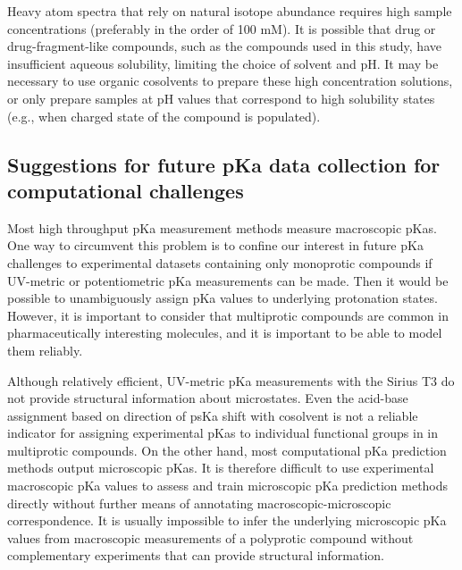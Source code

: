 \documentclass[9pt,lineno]{elife}
\begin{document}
Heavy atom spectra that rely on natural isotope abundance requires high sample concentrations (preferably in the order of 100 mM). It is possible that drug or drug-fragment-like compounds, such as the compounds used in this study, have insufficient aqueous solubility, limiting the choice of solvent and pH. 
It may be necessary to use organic cosolvents to prepare these high concentration solutions, or only prepare samples at pH values that correspond to high solubility states (e.g., when charged state of the compound is populated). 

\subsection{Suggestions for future pKa data collection for computational challenges}

Most high throughput pKa measurement methods measure macroscopic pKas. 
One way to circumvent this problem is to confine our interest in future pKa challenges to experimental datasets containing only monoprotic compounds if UV-metric or potentiometric pKa measurements can be made. 
Then it would be possible to unambiguously assign pKa values to underlying protonation states. 
However, it is important to consider that multiprotic compounds are common in pharmaceutically interesting molecules, and it is important to be able to model them reliably.

Although relatively efficient, UV-metric pKa measurements with the Sirius T3 do not provide structural information about microstates. 
Even the acid-base assignment based on direction of psKa shift with cosolvent is not a reliable indicator for assigning experimental pKas to individual functional groups in in multiprotic compounds. 
On the other hand, most computational pKa prediction methods output microscopic pKas. 
It is therefore difficult to use experimental macroscopic pKa values to assess and train microscopic pKa prediction methods directly without further means of annotating macroscopic-microscopic correspondence. 
It is usually impossible to infer the underlying microscopic pKa values from macroscopic measurements of a polyprotic compound without complementary experiments that can provide structural information. 
\end{document}
